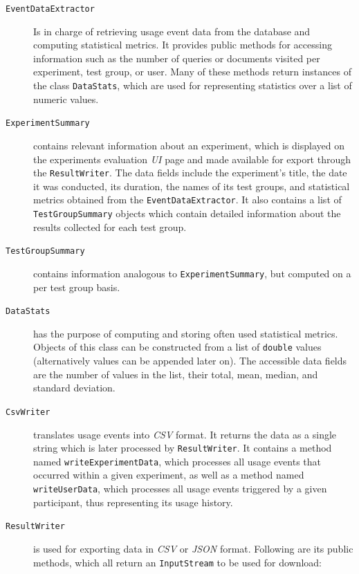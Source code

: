 \documentclass[a4paper]{usiinfbachelorproject}
\begin{document}
\begin{description}

    \item[\texttt{EventDataExtractor}] Is in charge of retrieving usage event data from the database and computing statistical metrics.
             It provides public methods for accessing information such as the number of queries or documents visited per experiment, 
             test group, or user. Many of these methods return instances of the class \texttt{DataStats}, which are used
             for representing statistics over a list of numeric values.

    \item[\texttt{ExperimentSummary}] contains relevant information about an experiment, which is displayed on the experiments
            evaluation \emph{UI} page and made available for export through the \texttt{ResultWriter}. The data fields
            include the experiment's title, the date it was conducted, its duration, the names of its test groups,
            and statistical metrics obtained from the \texttt{EventDataExtractor}. It also contains a list
            of \texttt{TestGroupSummary} objects which contain detailed information about the results collected for each test group.

    \item[\texttt{TestGroupSummary}] contains information analogous to \texttt{ExperimentSummary}, but computed on a per test group basis.

    \item[\texttt{DataStats}] has the purpose of computing and storing often used statistical metrics.
            Objects of this class can be constructed from a list of \texttt{double} values (alternatively values
            can be appended later on). The accessible data fields are the number of values in the list, their total,
            mean, median, and standard deviation.  

    \item[\texttt{CsvWriter}] translates usage events into \emph{CSV} format. It returns the data as a single string
            which is later processed by \texttt{ResultWriter}. It contains a method named \texttt{writeExperimentData},
            which processes all usage events that occurred within a given experiment, as well as a method
            named \texttt{writeUserData}, which processes all usage events triggered by a given participant, thus representing
            its usage history.

    \item[\texttt{ResultWriter}] is used for exporting data in \emph{CSV} or \emph{JSON} format. Following are its
            public methods, which all return an \texttt{InputStream} to be used for download:


\end{description}
\end{document}
